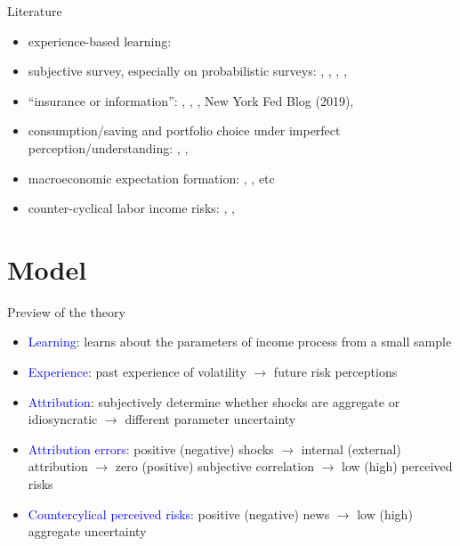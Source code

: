 \documentclass{beamer}
\begin{document}
\begin{frame}{Literature}
	\begin{itemize}
		\item experience-based learning: \cite{malmendier2015learning} 
		\item subjective survey, especially on probabilistic surveys: \cite{manski_measuring_2004}, \cite{delavande2011measuring}, \cite{manski_survey_2018},  \cite{bertrand_people_2001}, \cite{armantier_overview_2017}
		\item ``insurance or information'':  \cite{kaufmann_disentangling_2009},  \cite{meghir2011earnings}, \cite{pistaferri_superior_2001}, New York Fed Blog (2019),  \cite{flavin_excess_1988}
		\item consumption/saving and portfolio choice under imperfect perception/understanding:  \cite{rozsypal_overpersistence_2017}, \cite{carroll_sticky_2018}, \cite{lian2019imperfect}
		\item macroeconomic expectation formation: \cite{coibion2012can}, \cite{fuhrer2018intrinsic}, etc
		\item counter-cyclical labor income risks: \cite{storesletten2004cyclical}, \cite{guvenen2014nature}, \cite{catherine_countercyclical_2019}
	\end{itemize}
\end{frame}


\section{Model}


\begin{frame}{Preview of the theory}
	\begin{itemize}
		\item \textcolor{blue}{Learning}: learns about the parameters of income process from a small sample 
		\item \textcolor{blue}{Experience}: past experience of volatility $\rightarrow$  future risk perceptions 
		\item \textcolor{blue}{Attribution}: subjectively determine whether shocks are aggregate or idiosyncratic $\rightarrow$ different parameter uncertainty
		\item \textcolor{blue}{Attribution errors}: positive (negative) shocks $\rightarrow$ internal (external) attribution $\rightarrow$  zero (positive) subjective correlation $\rightarrow$ low (high) perceived risks 
		\item \textcolor{blue}{Countercylical perceived risks}: positive (negative) news $\rightarrow$ low (high) aggregate uncertainty  
		\end{itemize}
\end{frame}
\end{document}
